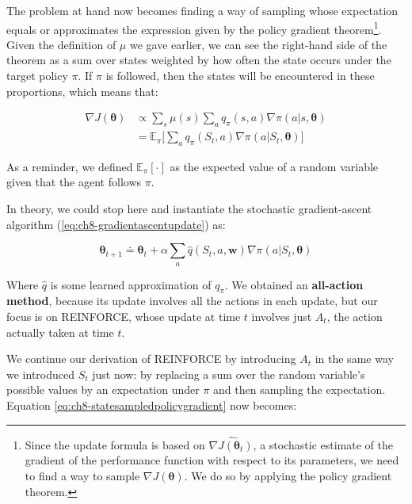 The problem at hand now becomes finding a way of sampling whose expectation equals or approximates the expression given by the policy gradient theorem\footnote{Since the update formula is based on $\widehat{\nabla J(\boldsymbol{\theta}_t)}$, a stochastic estimate of the gradient of the performance function with respect to its parameters, we need to find a way to sample $\nabla J(\boldsymbol{\theta})$. We do so by applying the policy gradient theorem.}. Given the definition of $\mu$ we gave earlier, we can see the right-hand side of the theorem as a sum over states weighted by how often the state occurs under the target policy $\pi$. If $\pi$ is followed, then the states will be encountered in these proportions, which means that:

\begin{equation}
    \begin{split}
        \nabla J(\boldsymbol{\theta}) &\propto \sum_s \mu(s) \sum_a q_\pi(s,a) \nabla\pi(a \vert s, \boldsymbol{\theta}) \\
        &= \mathbb{E}_\pi \Bigg[ \sum_a q_\pi (S_t, a) \nabla \pi (a \vert S_t, \boldsymbol{\theta}) \Bigg]
    \end{split}
    \label{eq:ch8-statesampledpolicygradient}
\end{equation}

As a reminder, we defined $\mathbb{E}_\pi \left[\cdot\right]$ as the expected value of a random variable given that the agent follows $\pi$.

In theory, we could stop here and instantiate the stochastic gradient-ascent algorithm (\ref{eq:ch8-gradientascentupdate}) as:

\begin{equation*}
    \boldsymbol{\theta}_{t+1} \doteq \boldsymbol{\theta}_{t} + \alpha \sum_a \hat{q}(S_t,a,\boldsymbol{w}) \nabla \pi (a \vert S_t, \boldsymbol{\theta})
\end{equation*}

Where $\hat{q}$ is some learned approximation of $q_\pi$. We obtained an \textbf{all-action method}, because its update involves all the actions in each update, but our focus is on REINFORCE, whose update at time $t$ involves just $A_t$, the action actually taken at time $t$.

We continue our derivation of REINFORCE by introducing $A_t$ in the same way we introduced $S_t$ just now: by replacing a sum over the random variable’s possible values by an expectation under $\pi$ and then sampling the expectation. Equation \ref{eq:ch8-statesampledpolicygradient} now becomes:

